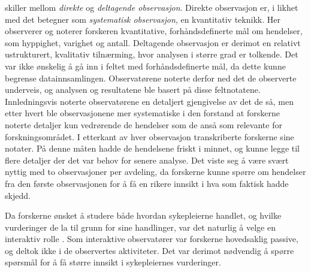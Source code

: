 \noindent
\citet{Greg} skiller mellom \textit{direkte} og \textit{deltagende observasjon}. Direkte observasjon er, i likhet med det \citet{Oates} betegner som \textit{systematisk observasjon}, en kvantitativ teknikk. Her observerer og noterer forskeren kvantitative, forhåndsdefinerte mål om hendelser, som hyppighet, varighet og antall. Deltagende observasjon er derimot en relativt ustrukturert, kvalitativ tilnærming, hvor analysen i større grad er tolkende. Det var ikke ønskelig å gå inn i feltet med forhåndsdefinerte mål, da dette kunne begrense datainnsamlingen. Observatørene noterte derfor ned det de observerte underveis, og analysen og resultatene ble basert på disse feltnotatene. Innledningsvis noterte observatørene en detaljert gjengivelse av det de så, men etter hvert ble observasjonene mer systematiske i den forstand at forskerne noterte detaljer kun vedrørende de hendelser som de anså som relevante for forskningsområdet. I etterkant av hver observasjon transkriberte forskerne sine notater. På denne måten hadde de hendelsene friskt i minnet, og kunne legge til flere detaljer der det var behov for senere analyse. Det viste seg å være svært nyttig med to observasjoner per avdeling, da forskerne kunne spørre om hendelser fra den første observasjonen for å få en rikere innsikt i hva som faktisk hadde skjedd.
 
\noindent
Da forskerne ønsket å studere både hvordan sykepleierne handlet, og  hvilke vurderinger de la til grunn for sine handlinger, var det naturlig å velge en interaktiv rolle \citet{Tjora}. Som interaktive observatører var forskerne hovedsaklig passive, og deltok ikke i de observertes aktiviteter. Det var derimot nødvendig å spørre spørsmål for å få større innsikt i sykepleiernes vurderinger.
 